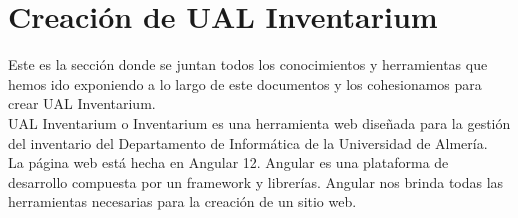 \section{Creación de UAL Inventarium}\label{sec:4_web}
Este es la sección donde se juntan todos los conocimientos y herramientas que hemos ido exponiendo a lo largo de este documentos y los cohesionamos para crear UAL Inventarium.
\\UAL Inventarium o Inventarium es una herramienta web diseñada para la gestión del inventario del Departamento de Informática de la Universidad de Almería.
\\La página web está hecha en Angular 12. Angular es una plataforma de desarrollo compuesta por un framework y librerías. Angular nos brinda todas las herramientas necesarias para la creación de un sitio web.






















